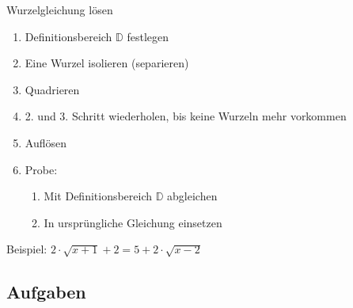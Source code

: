 \begin{rezept}{Wurzelgleichung lösen}{}
  \begin{enumerate}
  \item Definitionsbereich $\mathbb{D}$ festlegen
  \item Eine Wurzel isolieren (separieren)
  \item Quadrieren
  \item 2. und 3. Schritt wiederholen, bis keine Wurzeln mehr
    vorkommen
  \item Auflösen
  \item Probe:
    \begin{enumerate}
    \item Mit Definitionsbereich $\mathbb{D}$ abgleichen
    \item In ursprüngliche Gleichung einsetzen
    \end{enumerate}
  \end{enumerate}
\end{rezept}
\newpage


Beispiel: $2\cdot{}\sqrt{x+1} + 2 = 5 + 2\cdot{}\sqrt{x-2}$


\subsection*{Aufgaben}


\newpage
